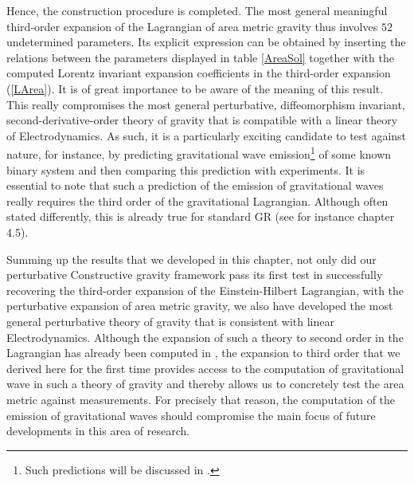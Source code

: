 Hence, the construction procedure is completed. The most general meaningful third-order expansion of the Lagrangian of area metric gravity thus involves $52$ undetermined parameters. Its explicit expression can be obtained by inserting the relations between the parameters displayed in table \ref{AreaSol} together with the computed Lorentz invariant expansion coefficients in the third-order expansion (\ref{LArea}). It is of great importance to be aware of the meaning of this result. This really compromises the most general perturbative, diffeomorphism invariant, second-derivative-order theory of gravity that is compatible with a linear theory of Electrodynamics. As such, it is a particularly exciting candidate to test against nature, for instance, by predicting gravitational wave emission\footnote{Such predictions will be discussed in \cite{NilsPHD}.} of some known binary system and then comparing this prediction with experiments. It is essential to note that such a prediction of the emission of gravitational waves really requires the third order of the gravitational Lagrangian. Although often stated differently, this is already true for standard GR (see for instance \cite{1984grra.book.....S} chapter 4.5).

Summing up the results that we developed in this chapter, not only did our perturbative Constructive gravity framework pass its first test in successfully recovering the third-order expansion of the Einstein-Hilbert Lagrangian, with the perturbative expansion of area metric gravity, we also have developed the most general perturbative theory of gravity that is consistent with linear Electrodynamics. Although the expansion of such a theory to second order in the Lagrangian has already been computed in \cite{2017arXiv170803870S}, the expansion to third order that we derived here for the first time provides access to the computation of gravitational wave in such a theory of gravity and thereby allows us to concretely test the area metric against measurements. For precisely that reason, the computation of the emission of gravitational waves should compromise the main focus of future developments in this area of research. 